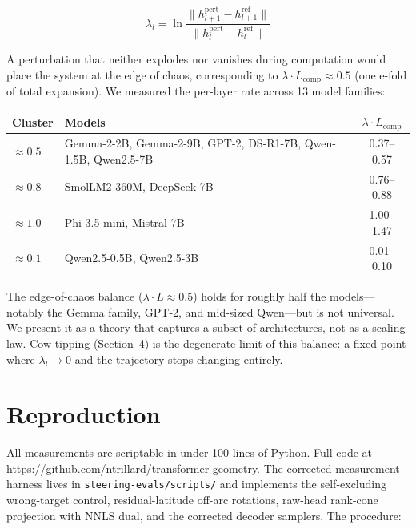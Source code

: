 \documentclass{article}
\begin{document}
\[
\lambda_l = \ln\frac{\|h_{l+1}^{\mathrm{pert}} - h_{l+1}^{\mathrm{ref}}\|}{\|h_l^{\mathrm{pert}} - h_l^{\mathrm{ref}}\|}
\]

A perturbation that neither explodes nor vanishes during computation would place
the system at the edge of chaos, corresponding to $\lambda \cdot
L_{\mathrm{comp}} \approx 0.5$ (one e-fold of total expansion). We measured the
per-layer rate across 13 model families:

\small
\begin{center}
\begin{tabular}{llc}
\toprule
Cluster & Models & $\lambda \cdot L_{\mathrm{comp}}$ \\
\midrule
$\approx 0.5$ & Gemma-2-2B, Gemma-2-9B, GPT-2, DS-R1-7B, Qwen-1.5B, Qwen2.5-7B & 0.37--0.57 \\
$\approx 0.8$ & SmolLM2-360M, DeepSeek-7B & 0.76--0.88 \\
$\approx 1.0$ & Phi-3.5-mini, Mistral-7B & 1.00--1.47 \\
$\approx 0.1$ & Qwen2.5-0.5B, Qwen2.5-3B & 0.01--0.10 \\
\bottomrule
\end{tabular}
\end{center}
\normalsize

The edge-of-chaos balance ($\lambda \cdot L \approx 0.5$) holds for roughly
half the models---notably the Gemma family, GPT-2, and mid-sized Qwen---but is
not universal. We present it as a theory that captures a subset of
architectures, not as a scaling law. Cow tipping (Section~4) is the degenerate
limit of this balance: a fixed point where $\lambda_l \to 0$ and the trajectory
stops changing entirely.

\section{Reproduction}

All measurements are scriptable in under 100 lines of Python. Full code at
\url{https://github.com/ntrillard/transformer-geometry}. The corrected
measurement harness lives in \texttt{steering-evals/scripts/} and implements
the self-excluding wrong-target control, residual-latitude off-arc rotations,
raw-head rank-cone projection with NNLS dual, and the corrected decoder
samplers. The procedure:
\end{document}
